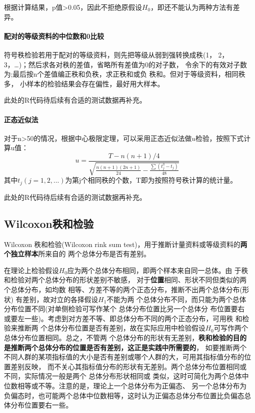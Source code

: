 \documentclass[
]{article}
\begin{document}
根据计算结果，p值\textgreater0.05，因此不拒绝原假设\(H_0\)，即还不能认为两种方法有差异。

\hypertarget{ux914dux5bf9ux7684ux7b49ux7ea7ux8d44ux6599ux7684ux4e2dux4f4dux6570ux548c0ux6bd4ux8f83}{%
\paragraph{配对的等级资料的中位数和0比较}\label{ux914dux5bf9ux7684ux7b49ux7ea7ux8d44ux6599ux7684ux4e2dux4f4dux6570ux548c0ux6bd4ux8f83}}

符号秩检验若用于配对的等级资料，则先把等级从弱到强转换成秩(1， 2，3，\ldots)；然后求各对秩的差值，省略所有差值为0的对子数，
令余下的有效对子数为;最后按n个差值编正秩和负秩，求正秩和或负 秩和。但对于等级资料，相同秩多，
小样本的检验结果会存在偏性，最好用大样本。

此处的R代码待后续有合适的测试数据再补充。

\hypertarget{ux6b63ux6001ux8fd1ux4f3cux6cd5-4}{%
\paragraph{正态近似法}\label{ux6b63ux6001ux8fd1ux4f3cux6cd5-4}}

对于n\textgreater50的情况，根据中心极限定理，可以采用正态近似法做\(u\)检验，按照下式计算u值：
\[u=\frac{T-n(n+1)/4}{\sqrt{\frac{n(n+1)(2n+1)}{24}-\frac{\sum(t_j^3-t_j)}{48}}}\]
其中\(t_j(j=1,2,...)\)为第j个相同秩的个数，T即为按照符号秩计算的统计量。

此处的R代码待后续有合适的测试数据再补充。

\hypertarget{wilcoxonux79e9ux548cux68c0ux9a8c}{%
\subsection{Wilcoxon秩和检验}\label{wilcoxonux79e9ux548cux68c0ux9a8c}}

Wilcoxon 秩和检验(Wilcoxon rink sum test)，用于推断计量资料或等级资料的\textbf{两个独立样本}所来自的
两个总体分布是否有差别。

在理论上检验假设\(H_0\)应为两个总体分布相同，即两个样本来自同一总体。由 于秩和检验对两个总体分布的形状差别不敏感，
对于\textbf{位置}相同、形状不同但类似的两个总体分布，如均数 相等、方差不等的两个正态分布，推断不出两个总体分布(形状)
有差别，故对立的各择假设\(H_1\)不能为两 个总体分布不同，而只能为两个总体分布位置不同(对单侧检验可写作某个
总体分布位置比另一个总体分 布位置要右或要左一些)。考虑到对方差不等、即总体分布不同的两个正态分布，可用秩
和检验来推断两 个总体分布位置是否有差别，故在实际应用中检验假设\(H_0\)可写作两个总体分布位置相同。总之，不管两
个总体分布的形状有无差别，\textbf{秩和检验的目的是推断两个总体分布的位置是否有差别，这正是实践中所需要的}，
如要推断两个不同人群的某项指标值的大小是否有差别或哪个人群的大，可用其指标值分布的位置差别反映，
而不关心其指标值分布的形状有无差别。两个总体分布位置相同或不同，实际情况一般是两个
总体分布形状相同或 类似，这时可简化为两个总体中位数相等或不等。注意的是，理论上一个总体分布为正偏态、
另一个总体分布为负偏态时，也可能两个总体中位数相等，这时认为正偏态总体分布位置比负偏态总体分布位置要右一些。
\end{document}
